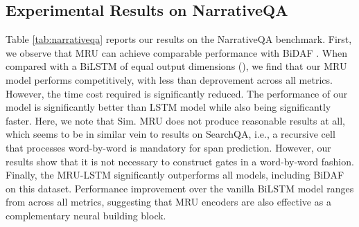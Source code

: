 \documentclass{article}
\begin{document}
\subsection{Experimental Results on NarrativeQA}
Table \ref{tab:narrativeqa} reports our results on the NarrativeQA benchmark. First, we observe that  MRU can achieve comparable performance with BiDAF \cite{seo2016bidirectional}. When compared with a BiLSTM of equal output dimensions (), we find that our MRU model performs competitively, with less than  deprovement across all metrics. However, the time cost required is significantly reduced. The performance of our model is significantly better than  LSTM model while also being significantly faster. Here, we note that Sim. MRU does not produce reasonable results at all, which seems to be in similar vein to results on SearchQA, i.e., a recursive cell that processes word-by-word is mandatory for span prediction. However, our results show that it is not necessary to construct gates in a word-by-word fashion. Finally, the MRU-LSTM significantly outperforms all models, including BiDAF on this dataset. Performance improvement over the vanilla BiLSTM model ranges from  across all metrics, suggesting that MRU encoders are also effective as a complementary neural building block. 
\end{document}
